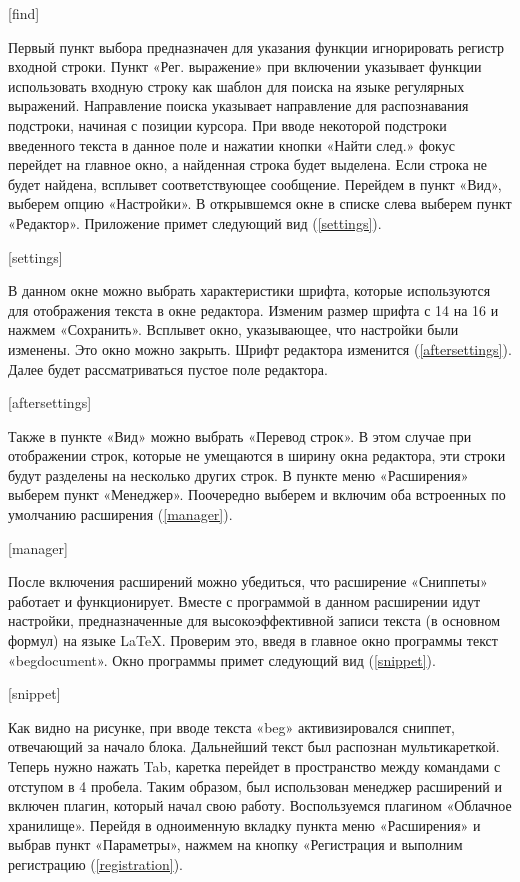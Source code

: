 ﻿\documentclass[opermanual]{espd}
\begin{document}
[find]

Первый пункт выбора предназначен для указания функции игнорировать регистр входной строки. Пункт «Рег. выражение» при включении указывает функции использовать входную строку как шаблон для поиска на языке регулярных выражений. Направление поиска указывает направление для распознавания подстроки, начиная с позиции курсора. При вводе некоторой подстроки введенного текста в данное поле и нажатии кнопки «Найти след.» фокус перейдет на главное окно, а найденная строка будет выделена. Если строка не будет найдена, всплывет соответствующее сообщение.
Перейдем в пункт «Вид», выберем опцию «Настройки». В открывшемся окне в списке слева выберем пункт «Редактор». Приложение примет следующий вид (\ref{settings}).

[settings]

В данном окне можно выбрать характеристики шрифта, которые используются для отображения текста в окне редактора. Изменим размер шрифта с 14 на 16 и нажмем «Сохранить». Всплывет окно, указывающее, что настройки были изменены. Это окно можно закрыть. Шрифт редактора изменится (\ref{aftersettings}). Далее будет рассматриваться пустое поле редактора.

[aftersettings]

Также в пункте «Вид» можно выбрать «Перевод строк». В этом случае при отображении строк, которые не умещаются в ширину окна редактора, эти строки будут разделены на несколько других строк.
В пункте меню «Расширения» выберем пункт «Менеджер». Поочередно выберем и включим оба встроенных по умолчанию расширения (\ref{manager}).

[manager]

После включения расширений можно убедиться, что расширение «Сниппеты» работает и функционирует. Вместе с программой в данном расширении идут настройки, предназначенные для высокоэффективной записи текста (в основном формул) на языке LaTeX. Проверим это, введя в главное окно программы текст «begdocument». Окно программы примет следующий вид (\ref{snippet}).

[snippet]

Как видно на рисунке, при вводе текста «beg» активизировался сниппет, отвечающий за начало блока. Дальнейший текст был распознан мультикареткой. Теперь нужно нажать Tab, каретка перейдет в пространство между командами с отступом в 4 пробела. Таким образом, был использован менеджер расширений и включен плагин, который начал свою работу.
Воспользуемся плагином «Облачное хранилище». Перейдя в одноименную вкладку пункта меню «Расширения» и выбрав пункт «Параметры», нажмем на кнопку «Регистрация и выполним регистрацию (\ref{registration}).
\end{document}
